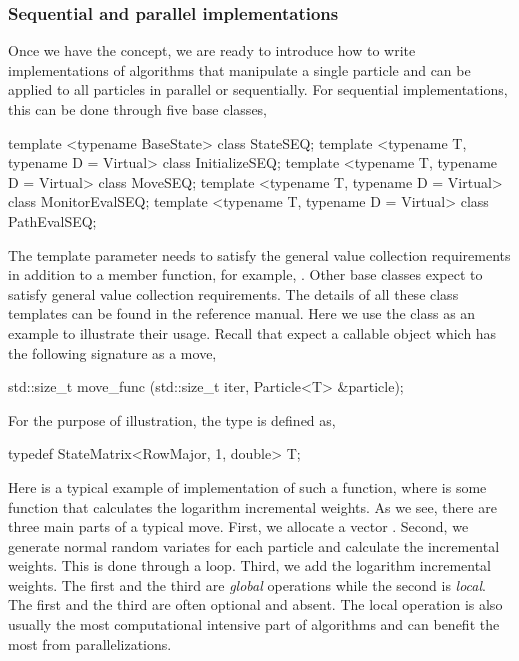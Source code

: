 \subsubsection{Sequential and parallel implementations}
\label{ssub:Sequential and parallel implementations}

Once we have the  concept, we are ready to
introduce how to write implementations of \smc algorithms that manipulate a
single particle and can be applied to all particles in parallel or
sequentially. For sequential implementations, this can be done through five
base classes,
\begin{cppcode}
template <typename BaseState> class StateSEQ;
template <typename T, typename D = Virtual> class InitializeSEQ;
template <typename T, typename D = Virtual> class MoveSEQ;
template <typename T, typename D = Virtual> class MonitorEvalSEQ;
template <typename T, typename D = Virtual> class PathEvalSEQ;
\end{cppcode}
The template parameter  needs to satisfy the general
value collection requirements in addition to a 
member function, for example, . Other base classes
expect  to satisfy general value collection requirements. The
details of all these class templates can be found in the reference manual.
Here we use the  class as an example to illustrate their
usage. Recall that  expect a callable object which has
the following signature as a move,
\begin{cppcode}
std::size_t move_func (std::size_t iter, Particle<T> &particle);
\end{cppcode}
For the purpose of illustration, the type  is defined as,
\begin{cppcode}
typedef StateMatrix<RowMajor, 1, double> T;
\end{cppcode}
Here is a typical example of implementation of such a function,
where  is some function that calculates the
logarithm incremental weights. As we see, there are three main parts of a
typical move. First, we allocate a vector . Second, we
generate normal random variates for each particle and calculate the
incremental weights. This is done through a  loop. Third, we
add the logarithm incremental weights. The first and the third are
\emph{global} operations while the second is \emph{local}. The first and the
third are often optional and absent. The local operation is also usually the
most computational intensive part of \smc algorithms and can benefit the most
from parallelizations.

